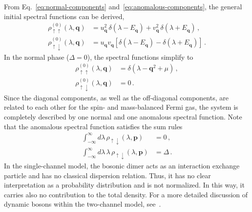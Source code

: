 From Eq.~\eqref{eq:normal-components} and~\eqref{eq:anomalous-components}, the general initial spectral functions can be derived,
%
\begin{align}
	\label{eq:initial-spectral-functions}
	\rho^{(0)}_{\uparrow\uparrow}(\lambda,\bm{q}) &= u_{\bm{q}}^2\, \delta(\lambda-E_{\bm{q}}) + v_{\bm{q}}^2\, \delta(\lambda+E_{\bm{q}}) \,, \\
	\rho^{(0)}_{\uparrow\downarrow}(\lambda,\bm{q}) &= u_{\bm{q}} v_{\bm{q}} \left[\delta(\lambda-E_{\bm{q}}) - \delta(\lambda+E_{\bm{q}})\right] \,.
\end{align}
%
In the normal phase ($\Delta=0$), the spectral functions simplify to
%
\begin{align}
	\label{eq:normal-spectral-functions}
	\rho^{(0)}_{\uparrow\uparrow}(\lambda,\bm{q}) &= \delta(\lambda-\bm{q}^2+\mu) \,, \\
	\rho^{(0)}_{\uparrow\downarrow}(\lambda,\bm{q}) &= 0 \,.
\end{align}
%
Since the diagonal components, as well as the off-diagonal components, are related to each other for the spin- and mass-balanced Fermi gas, the system is completely described by one normal and one anomalous spectral function. Note that the anomalous spectral function satisfies the sum rules~\cite{Pieri2004-1}
%
\begin{align}
	\label{eq:anomalous-sum-rules}
	\int_{-\infty}^{\infty} d\lambda\, \rho_{\uparrow\downarrow}(\lambda,\bm{p}) &= 0 \,, \\
	\int_{-\infty}^{\infty} d\lambda\,\lambda\, \rho_{\uparrow\downarrow}(\lambda,\bm{p}) &= \Delta \,.
\end{align}
%
In the single-channel model, the bosonic dimer acts as an interaction exchange particle and has no classical dispersion relation. Thus, it has no clear interpretation as a probability distribution and is not normalized. In this way, it carries also no contribution to the total density. For a more detailed discussion of dynamic bosons within the two-channel model, see~\cite{Diehl2006-1,Diehl2007,Schmidt2013}.


